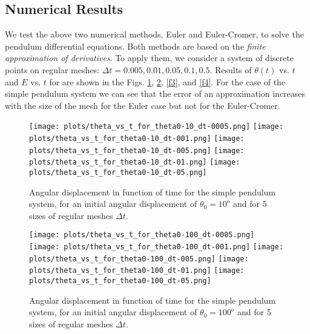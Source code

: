 \documentclass[12pt]{article}
\begin{document}
\quad

\subsection*{Numerical Results}


We test the above two numerical methods, Euler and Euler-Cromer, to solve the pendulum differential equations.  Both methods are based on the {\it finite approximation of derivatives}. To apply them, we consider a system of discrete points on regular meshes: $\Delta t = 0.005, 0.01, 0.05, 0.1, 0.5$. Results of $\theta(t)$ vs. $t$ and $E$ vs. $t$ for  are shown in the Figs. \ref{f1},  \ref{f2}, \ref{f3}, and \ref{f4}. For the case of the simple pendulum system we can see that the error of an approximation increases with the size of the mesh for the Euler case but not for the Euler-Cromer.



\begin{figure} [ht]
\begin{center}
\texttt{[image: plots/theta\_vs\_t\_for\_theta0-10\_dt-0005.png]} 
\texttt{[image: plots/theta\_vs\_t\_for\_theta0-10\_dt-001.png]} 
\texttt{[image: plots/theta\_vs\_t\_for\_theta0-10\_dt-005.png]} 
\texttt{[image: plots/theta\_vs\_t\_for\_theta0-10\_dt-01.png]} 
\texttt{[image: plots/theta\_vs\_t\_for\_theta0-10\_dt-05.png]} 
\caption{Angular displacement in function of time for the simple pendulum system, for an initial angular displacement of $\theta_0=10^o$ and for 5 sizes of regular meshes $\Delta t$.}
\label{f1}
\end{center}
\end{figure}



\begin{figure} [ht]
\begin{center}
\texttt{[image: plots/theta\_vs\_t\_for\_theta0-100\_dt-0005.png]} 
\texttt{[image: plots/theta\_vs\_t\_for\_theta0-100\_dt-001.png]} 
\texttt{[image: plots/theta\_vs\_t\_for\_theta0-100\_dt-005.png]} 
\texttt{[image: plots/theta\_vs\_t\_for\_theta0-100\_dt-01.png]} 
\texttt{[image: plots/theta\_vs\_t\_for\_theta0-100\_dt-05.png]} 
\caption{Angular displacement in function of time for the simple pendulum system, for an initial angular displacement of $\theta_0=100^o$ and for 5 sizes of regular meshes $\Delta t$.}
\label{f2}
\end{center}
\end{figure}
\end{document}
